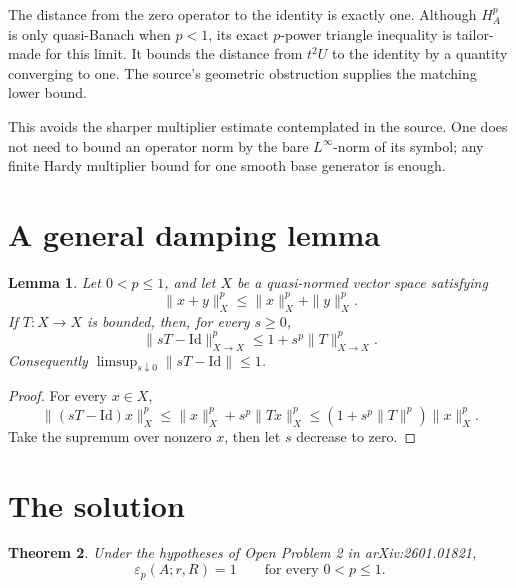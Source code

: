 \documentclass[11pt]{article}
\newtheorem{theorem}{Theorem}
\newtheorem{lemma}[theorem]{Lemma}
\theoremstyle{remark}
\newcommand{\Id}{\mathrm{Id}}
\newcommand{\eps}{\varepsilon}
\begin{document}
The distance from the zero operator to the identity is exactly one. Although
\(H_A^p\) is only quasi-Banach when \(p<1\), its exact \(p\)-power triangle
inequality is tailor-made for this limit. It bounds the distance from
\(t^2U\) to the identity by a quantity converging to one. The source's
geometric obstruction supplies the matching lower bound.

This avoids the sharper multiplier estimate contemplated in the source. One
does not need to bound an operator norm by the bare \(L^\infty\)-norm of its
symbol; any finite Hardy multiplier bound for one smooth base generator is
enough.

\section{A general damping lemma}

\begin{lemma}\label{lem:damping}
Let \(0<p\le1\), and let \(X\) be a quasi-normed vector space satisfying
\[
 \|x+y\|_X^p\le \|x\|_X^p+\|y\|_X^p.
\]
If \(T:X\to X\) is bounded, then, for every \(s\ge0\),
\[
 \|sT-\Id\|_{X\to X}^p\le1+s^p\|T\|_{X\to X}^p.
\]
Consequently \(\limsup_{s\downarrow0}\|sT-\Id\|\le1\).
\end{lemma}

\begin{proof}
For every \(x\in X\),
\[
 \|(sT-\Id)x\|_X^p
 \le \|x\|_X^p+s^p\|Tx\|_X^p
 \le (1+s^p\|T\|^p)\|x\|_X^p.
\]
Take the supremum over nonzero \(x\), then let \(s\) decrease to zero.
\end{proof}

\section{The solution}

\begin{theorem}\label{thm:main}
Under the hypotheses of Open Problem 2 in arXiv:2601.01821,
\[
 \boxed{\eps_p(A;r,R)=1\qquad\text{for every }0<p\le1.}
\]
\end{theorem}
\end{document}
